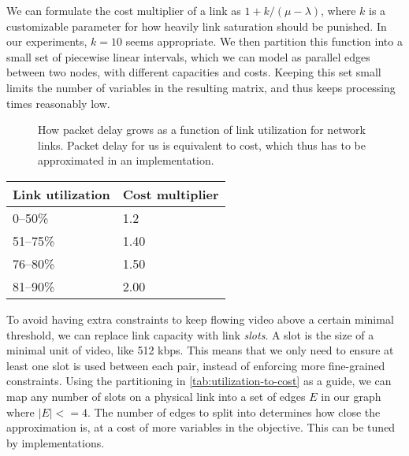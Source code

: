 We can formulate the cost multiplier of a link as $1 + k/(\mu - \lambda)$, where $k$ is a customizable parameter for how heavily link saturation should be punished. In our experiments, $k=10$ seems appropriate. We then partition this function into a small set of piecewise linear intervals, which we can model as parallel edges between two nodes, with different capacities and costs. Keeping this set small limits the number of variables in the resulting matrix, and thus keeps processing times reasonably low.

\begin{figure}
    \centering
    \caption{How packet delay grows as a function of link utilization for network links. Packet delay for us is equivalent to cost, which thus has to be approximated in an implementation.}
    \label{fig:utility-latency}
\end{figure}


\begin{center}
    \label{tab:utilization-to-cost}
    \begin{tabular}{| l | l |}
    \hline
    \textbf{Link utilization} & \textbf{Cost multiplier} \\ \hline
    0--50\% & 1.2 \\ \hline
    51--75\% & 1.40 \\ \hline
    76--80\% & 1.50 \\ \hline
    81--90\% & 2.00 \\ \hline
    \end{tabular}
\end{center}

To avoid having extra constraints to keep flowing video above a certain minimal threshold, we can replace link capacity with link \emph{slots}. A slot is the size of a minimal unit of video, like 512 kbps. This means that we only need to ensure at least one slot is used between each pair, instead of enforcing more fine-grained constraints. Using the partitioning in \autoref{tab:utilization-to-cost} as a guide, we can map any number of slots on a physical link into a set of edges $E$ in our graph where $|E| <= 4$. The number of edges to split into determines how close the approximation is, at a cost of more variables in the objective. This can be tuned by implementations.

